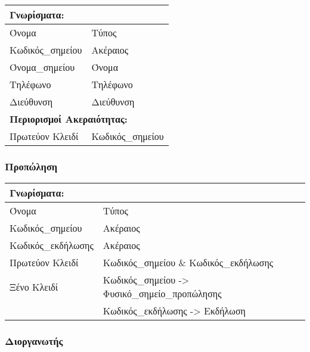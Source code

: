 \begin{tabular}{|p{6cm}|p{8cm}|}
  \multicolumn{2}{l}{\textbf{Γνωρίσματα:}}               \\ \hline
  Όνομα            & Τύπος                               \\ \hline
  Κωδικός\_σημείου & Ακέραιος                            \\ \hline
  Όνομα\_σημείου   & Όνομα                               \\ \hline
  Τηλέφωνο         & Τηλέφωνο                            \\ \hline
  Διεύθυνση        & Διεύθυνση                           \\ \hline
  \multicolumn{2}{l}{\textbf{Περιορισμοί Ακεραιότητας:}} \\ \hline
  Πρωτεύον Κλειδί  & Κωδικός\_σημείου                    \\ \hline
\end{tabular}

\subsubsection*{Προπώληση}

\begin{tabular}{|p{6cm}|p{8cm}|}
  \multicolumn{2}{l}{\textbf{Γνωρίσματα:}}                    \\ \hline
  Όνομα              & Τύπος                                  \\ \hline
  Κωδικός\_σημείου   & Ακέραιος                               \\ \hline
  Κωδικός\_εκδήλωσης & Ακέραιος                               \\ \hline
  Πρωτεύον Κλειδί    & Κωδικός\_σημείου \& Κωδικός\_εκδήλωσης \\ \hline
  Ξένο Κλειδί        & Κωδικός\_σημείου -> Φυσικό\_σημείο\_προπώλησης
                                                              \\ \hline
                     & Κωδικός\_εκδήλωσης -> Εκδήλωση         \\ \hline
\end{tabular}


\subsubsection*{Διοργανωτής}

